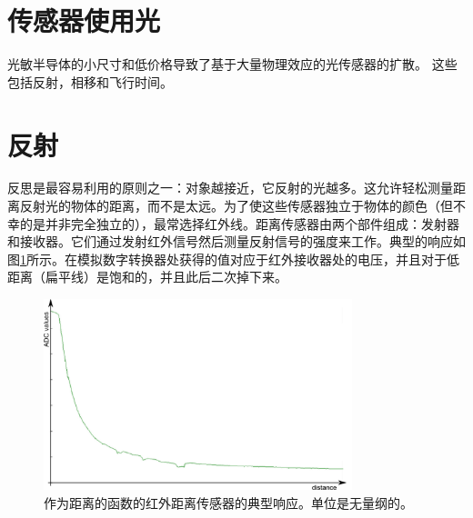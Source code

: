 \section{传感器使用光}
光敏半导体的小尺寸和低价格导致了基于大量物理效应的光传感器的扩散。 这些包括反射，相移和飞行时间。


\section{反射}

反思是最容易利用的原则之一：对象越接近，它反射的光越多。这允许轻松测量距离反射光的物体的距离，而不是太远。为了使这些传感器独立于物体的颜色（但不幸的是并非完全独立的），最常选择红外线。距离传感器由两个部件组成：发射器和接收器。它们通过发射红外信号然后测量反射信号的强度来工作。典型的响应如图\ref{fig:epuckir}所示。在模拟数字转换器处获得的值对应于红外接收器处的电压，并且对于低距离（扁平线）是饱和的，并且此后二次掉下来。


\begin{figure}
	\centering
		\includegraphics[width=0.8\textwidth]{figs/epuckirsensor.png}
	\caption{作为距离的函数的红外距离传感器的典型响应。单位是无量纲的。}
	\label{fig:epuckir}
\end{figure}

